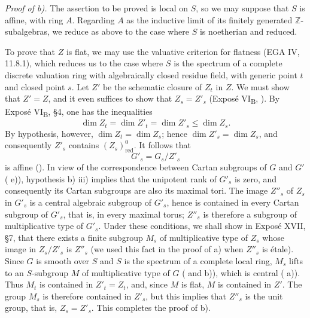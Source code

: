 \medskip
\noindent\textit{Proof of  b).}
The assertion to be proved is local on \(S\), so we may suppose
that \(S\) is affine, with ring \(A\). Regarding \(A\) as the
inductive limit of its finitely generated
\(\mathbb Z\)-subalgebras, we reduce as above to the case where
\(S\) is noetherian and reduced.

To prove that \(Z\) is flat, we may use the valuative criterion
for flatness (EGA IV, 11.8.1), which reduces us to the case where
\(S\) is the spectrum of a complete discrete valuation ring with
algebraically closed residue field, with generic point \(t\) and
closed point \(s\). Let \(Z'\) be the schematic closure of \(Z_t\)
in \(Z\). We must show that \(Z'=Z\), and it even suffices to show
that \(Z_s=Z'_s\) (Exposé VI\textsubscript{B}, ). By Exposé
VI\textsubscript{B}, \S4, one has the inequalities
\[
  \dim Z_t=\dim Z'_t=\dim Z'_s\leq \dim Z_s.
\]
By hypothesis, however, \(\dim Z_t=\dim Z_s\); hence
\(\dim Z'_s=\dim Z_s\), and consequently \(Z'_s\) contains
\((Z_s)^0_{\mathrm{red}}\). It follows that
\[
  G'_s=G_s/Z'_s
\]
is affine (). In view of the correspondence between
Cartan subgroups of \(G\) and \(G'\) ( e)),
hypothesis  b) iii) implies that the unipotent rank of \(G'_s\)
is zero, and consequently its Cartan subgroups are also its
maximal tori. The image \(Z''_s\) of \(Z_s\) in \(G'_s\) is a
central algebraic subgroup of \(G'_s\), hence is contained in
every Cartan subgroup of \(G'_s\), that is, in every maximal
torus; \(Z''_s\) is therefore a subgroup of multiplicative type
of \(G'_s\). Under these conditions, we shall show in Exposé XVII,
\S7, that there exists a finite subgroup \(M_s\) of multiplicative
type of \(Z_s\) whose image in \(Z_s/Z'_s\) is \(Z''_s\) (we used
this fact in the proof of  a) when \(Z''_s\) is étale). Since
\(G\) is smooth over \(S\) and \(S\) is the spectrum of a complete
local ring, \(M_s\) lifts to an \(S\)-subgroup \(M\) of
multiplicative type of \(G\) ( and  b)), which is central ( a)). Thus \(M_t\) is
contained in \(Z'_t=Z_t\), and, since \(M\) is flat, \(M\) is
contained in \(Z'\). The group \(M_s\) is therefore contained in
\(Z'_s\), but this implies that \(Z''_s\) is the unit group, that
is, \(Z_s=Z'_s\). This completes the proof of  b).

